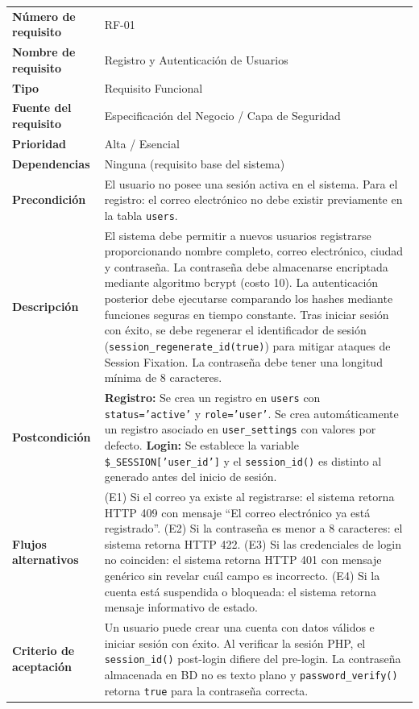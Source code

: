 \documentclass[11pt,a4paper]{report}
\begin{document}
\begin{table}[H]
\centering
\begin{tabularx}{\textwidth}{|l|L|}
\hline
{} \\ \hline
\textbf{Número de requisito} & RF-01 \\ \hline
\textbf{Nombre de requisito} & Registro y Autenticación de Usuarios \\ \hline
\textbf{Tipo} & Requisito Funcional \\ \hline
\textbf{Fuente del requisito} & Especificación del Negocio / Capa de Seguridad \\ \hline
\textbf{Prioridad} & Alta / Esencial \\ \hline
\textbf{Dependencias} & Ninguna (requisito base del sistema) \\ \hline
\textbf{Precondición} & El usuario no posee una sesión activa en el sistema. Para el registro: el correo electrónico no debe existir previamente en la tabla \texttt{users}. \\ \hline
\textbf{Descripción} & El sistema debe permitir a nuevos usuarios registrarse proporcionando nombre completo, correo electrónico, ciudad y contraseña. La contraseña debe almacenarse encriptada mediante algoritmo bcrypt (costo 10). La autenticación posterior debe ejecutarse comparando los hashes mediante funciones seguras en tiempo constante. Tras iniciar sesión con éxito, se debe regenerar el identificador de sesión (\texttt{session\_regenerate\_id(true)}) para mitigar ataques de Session Fixation. La contraseña debe tener una longitud mínima de 8 caracteres. \\ \hline
\textbf{Postcondición} & \textbf{Registro:} Se crea un registro en \texttt{users} con \texttt{status='active'} y \texttt{role='user'}. Se crea automáticamente un registro asociado en \texttt{user\_settings} con valores por defecto. \textbf{Login:} Se establece la variable \texttt{\$\_SESSION['user\_id']} y el \texttt{session\_id()} es distinto al generado antes del inicio de sesión. \\ \hline
\textbf{Flujos alternativos} & (E1) Si el correo ya existe al registrarse: el sistema retorna HTTP 409 con mensaje ``El correo electrónico ya está registrado''. (E2) Si la contraseña es menor a 8 caracteres: el sistema retorna HTTP 422. (E3) Si las credenciales de login no coinciden: el sistema retorna HTTP 401 con mensaje genérico sin revelar cuál campo es incorrecto. (E4) Si la cuenta está suspendida o bloqueada: el sistema retorna mensaje informativo de estado. \\ \hline
\textbf{Criterio de aceptación} & Un usuario puede crear una cuenta con datos válidos e iniciar sesión con éxito. Al verificar la sesión PHP, el \texttt{session\_id()} post-login difiere del pre-login. La contraseña almacenada en BD no es texto plano y \texttt{password\_verify()} retorna \texttt{true} para la contraseña correcta. \\ \hline
\end{tabularx}
\end{table}
\end{document}
